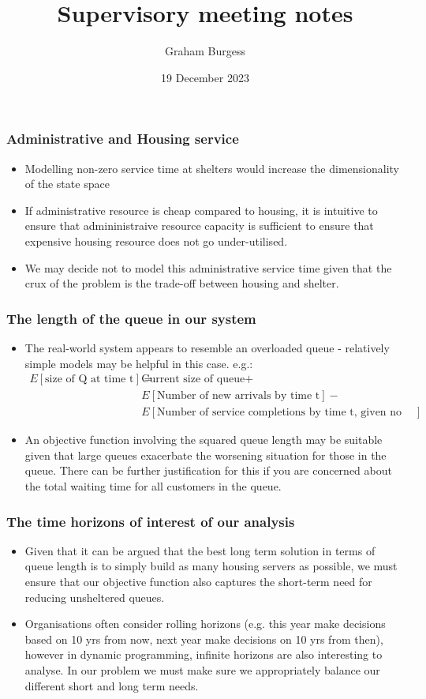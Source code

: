 \documentclass{article}
\title{Supervisory meeting notes}
\author{Graham Burgess}
\date{19 December 2023}
\begin{document}
%
\maketitle
%
\subsubsection*{Administrative and Housing service}
%
\begin{itemize}
\item Modelling non-zero service time at shelters would increase the dimensionality of the state space
\item If administrative resource is cheap compared to housing, it is intuitive to ensure that admininistraive resource capacity is sufficient to ensure that expensive housing resource does not go under-utilised.
\item We may decide not to model this administrative service time given that the crux of the problem is the trade-off between housing and shelter.
\end{itemize}
%
\subsubsection*{The length of the queue in our system}
%
\begin{itemize}
\item The real-world system appears to resemble an overloaded queue - relatively simple models may be helpful in this case. e.g.:
%
  \begin{align*}
    E[\text{size of Q at time t}] = & \text{Current size of queue} + \\
                                    & E[\text{Number of new arrivals by time t}] - \\
                                    & E[\text{Number of service completions by time t, given no breaks in service}]
  \end{align*}
%  
\item An objective function involving the squared queue length may be suitable given that large queues exacerbate the  worsening situation for those in the queue. There can be further justification for this if you are concerned about the total waiting time for all customers in the queue. 
\end{itemize}
%
\subsubsection*{The time horizons of interest of our analysis}
%
\begin{itemize}
\item Given that it can be argued that the best long term solution in terms of queue length is to simply build as many housing servers as possible, we must ensure that our objective function also captures the short-term need for reducing unsheltered queues.
\item Organisations often consider rolling horizons (e.g. this year make decisions based on 10 yrs from now, next year make decisions on 10 yrs from then), however in dynamic programming, infinite horizons are also interesting to analyse. In our problem we must make sure we appropriately balance our different short and long term needs.
\end{itemize}
%
\end{document}
